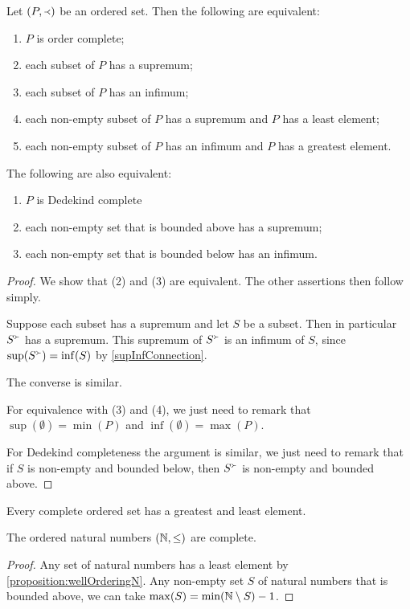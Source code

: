 \begin{proposition} \label{existenceSupremaInfima}
Let $(P,\Yleft)$ be an ordered set. Then the following are equivalent:
\begin{enumerate}
\item $P$ is order complete;
\item each subset of $P$ has a supremum;
\item each subset of $P$ has an infimum;
\item each non-empty subset of $P$ has a supremum and $P$ has a least element;
\item each non-empty subset of $P$ has an infimum and $P$ has a greatest element.
\end{enumerate}
The following are also equivalent:
\begin{enumerate}
\item $P$ is Dedekind complete
\item each non-empty set that is bounded above has a supremum;
\item each non-empty set that is bounded below has an infimum.
\end{enumerate}
\end{proposition}
\begin{proof}
We show that (2) and (3) are equivalent. The other assertions then follow simply.

Suppose each subset has a supremum and let $S$ be a subset. Then in particular $S^\Yright$ has a supremum. This supremum of $S^\Yright$ is an infimum of $S$, since $\sup(S^\Yright) = \inf(S)$ by \ref{supInfConnection}.

The converse is similar.

For equivalence with (3) and (4), we just need to remark that $\sup(\emptyset) = \min(P)$ and $\inf(\emptyset) = \max(P)$.

For Dedekind completeness the argument is similar, we just need to remark that if $S$ is non-empty and bounded below, then $S^\Yright$ is non-empty and bounded above.
\end{proof}
\begin{corollary}
Every complete ordered set has a greatest and least element.
\end{corollary}


\begin{lemma}
The ordered natural numbers $\sSet{\N,\leq}$ are complete.
\end{lemma}
\begin{proof}
Any set of natural numbers has a least element by \ref{proposition:wellOrderingN}. Any non-empty set $S$ of natural numbers that is bounded above, we can take $\max(S) = \min(\mathbb{N}\setminus S)-1$.
\end{proof}

